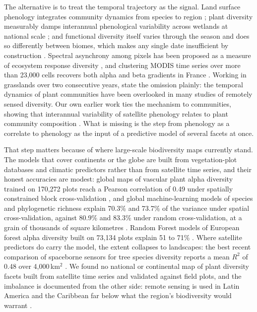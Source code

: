 \documentclass[preprint,12pt]{elsarticle}
\begin{document}
The alternative is to treat the temporal trajectory as the signal. Land surface phenology
integrates community dynamics from species to region \citep{dronova2022remote}; plant
diversity measurably damps interannual phenological variability across wetlands at national
scale \citep{dronova2022plant}; and functional diversity itself varies through the season
and does so differently between biomes, which makes any single date insufficient by
construction \citep{mederer2025unraveling}. Spectral asynchrony among pixels has been
proposed as a measure of ecosystem response diversity \citep{mazzochini2024spectral}, and
clustering MODIS time series over more than 23,000 cells recovers both alpha and beta
gradients in France \citep{lenormand2025spectral}. Working in grasslands over two
consecutive years, \citet{gholizadeh2020multitemporal} state the omission plainly: the
temporal dynamics of plant communities have been overlooked in many studies of remotely
sensed diversity. Our own earlier work ties the mechanism to communities, showing that
interannual variability of satellite phenology relates to plant community composition
\citep{lopatin2023interannual,lopatin2026remotely}. What is missing is the step from
phenology as a correlate to phenology as the input of a predictive model of several facets
at once.

That step matters because of where large-scale biodiversity maps currently stand. The
models that cover continents or the globe are built from vegetation-plot databases and
climatic predictors rather than from satellite time series, and their honest accuracies are
modest: global maps of vascular plant alpha diversity trained on 170,272 plots reach a
Pearson correlation of 0.49 under spatially constrained block cross-validation
\citep{sabatini2022global}, and global machine-learning models of species and phylogenetic
richness explain 70.3\% and 73.7\% of the variance under spatial cross-validation, against
80.9\% and 83.3\% under random cross-validation, at a grain of thousands of square
kilometres \citep{cai2023global}. Random Forest models of European forest alpha diversity
built on 73,134 plots explain 51 to 71\% \citep{vecera2019alpha}. Where satellite
predictors do carry the model, the extent collapses to landscapes: the best recent
comparison of spaceborne sensors for tree species diversity reports a mean $R^2$ of 0.48
over 4,000\,km$^2$ \citep{liu2024tree}. We found no national or continental map of plant
diversity facets built from satellite time series and validated against field plots, and
the imbalance is documented from the other side: remote sensing is used in Latin America
and the Caribbean far below what the region's biodiversity would warrant
\citep{garzonlopez2024remote}.
\end{document}

